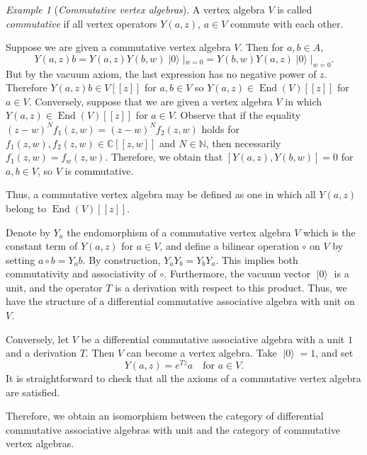 \documentclass[a4paper, 12pt, reqno]{amsart}
\theoremstyle{remark}
\newtheorem{example}[theorem]{Example}
\numberwithin{equation}{subsection}
\DeclareMathOperator{\End}{End}
\DeclareMathOperator{\vac}{|0\rangle}
\begin{document}
\begin{example}[\emph{Commutative vertex algebras}]
  \label{exa:4}
  A vertex algebra $V$ is called \emph{commutative} if all vertex operators $Y(a, z)$, $a \in V$ commute with each other.

  Suppose we are given a commutative vertex algebra $V$.
  Then for $a, b \in A$,
  \begin{equation*}
    Y(a, z)b = Y(a, z)Y(b, w)\vac|_{w = 0} = Y(b, w)Y(a, z)\vac|_{w = 0}.
  \end{equation*}
  But by the vacuum axiom, the last expression has no negative power of $z$.
  Therefore $Y(a, z)b \in V[[z]]$ for $a, b \in V$ so $Y(a, z) \in \End(V)[[z]]$ for $a \in V$.
  Conversely, suppose that we are given a vertex algebra $V$ in which $Y(a, z) \in \End(V)[[z]]$ for $a \in V$.
  Observe that if the equality $(z - w)^Nf_1(z, w) = (z - w)^Nf_2(z, w)$ holds for $f_1(z, w), f_2(z, w) \in \mathbb{C}[[z, w]]$ and $N \in \mathbb{N}$, then necessarily $f_1(z, w) = f_w(z, w)$.
  Therefore, we obtain that $[Y(a, z), Y(b, w)] = 0$ for $a, b \in V$, so $V$ is commutative.

  Thus, a commutative vertex algebra may be defined as one in which all $Y(a, z)$ belong to $\End(V)[[z]]$.

  Denote by $Y_a$ the endomorphism of a commutative vertex algebra $V$ which is the constant term of $Y(a, z)$ for $a \in V$, and define a bilinear operation $\circ$ on $V$ by setting $a\circ b = Y_ab$.
  By construction, $Y_aY_b = Y_bY_a$.
  This implies both commutativity and associativity of $\circ$.
  Furthermore, the vacuum vector $\vac$ is a unit, and the operator $T$ is a derivation with respect to this product.
  Thus, we have the structure of a differential commutative associative algebra with unit on $V$.

  Conversely, let $V$ be a differential commutative associative algebra with a unit $1$ and a derivation $T$.
  Then $V$ can become a vertex algebra.
  Take $\vac = 1$, and set
  \begin{equation*}
    Y(a, z) = e^{Tz}a \quad \text{for }a \in V.
  \end{equation*}
  It is straightforward to check that all the axioms of a commutative vertex algebra are satisfied.

  Therefore, we obtain an isomorphism between the category of differential commutative associative algebras with unit and the category of commutative vertex algebras.
\end{example}
\end{document}
